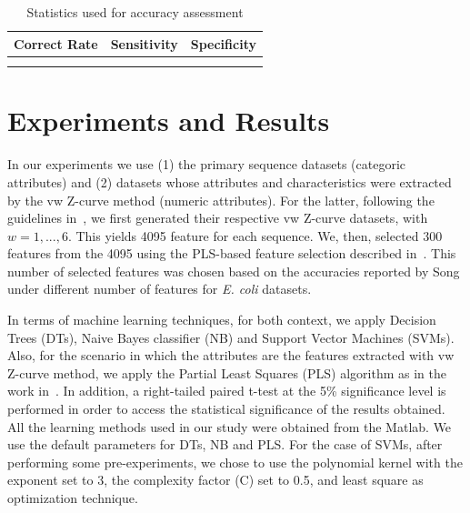 \documentclass[conference]{IEEEtran}
\begin{document}
\begin{table}
\caption{Statistics used for accuracy assessment}
\begin{center}
    \renewcommand{\arraystretch}{1.2}
    \begin{tabular}{>{\centering\arraybackslash} m{} 
                    >{\centering\arraybackslash} m{} 
                    >{\centering\arraybackslash} m{}}
        \hline
            Correct Rate & Sensitivity & Specificity \\
        \hline
            \multirow{2}{*}{$\dfrac {TP+TN}{TP+FP+TN+FN}$}       &
            \multirow{2}{*}{$\dfrac {TP}{TP+FN}$}                &
            \multirow{2}{*}{$\dfrac {TN}{TN+FP}$}                \\
            & & \\
        \hline
    \end{tabular}
\end{center}
\label{table:acc}
\end{table}

\section{Experiments and Results}

In our experiments we use (1) the primary sequence datasets (categoric attributes) and (2) datasets whose attributes and characteristics were extracted by the vw Z-curve method (numeric attributes). For the latter, following the guidelines in~\cite{song2011a}, we first generated their respective vw Z-curve datasets, with $ w = 1, ..., 6 $. This yields 4095 feature for each sequence. We, then, selected 300 features from the 4095 using the PLS-based feature selection described in~\cite{song2011a}. This number of selected features was chosen based on the accuracies reported by Song under different number of features for {\it E. coli } datasets. 

In terms of machine learning techniques, for both context, we apply Decision Trees (DTs), Naive Bayes classifier (NB) and Support Vector Machines (SVMs).  Also, for the scenario in which the attributes are the features extracted with vw Z-curve method, we apply the Partial Least Squares (PLS) algorithm as in the work in~\cite{song2011a}. In addition, a right-tailed paired t-test at the 5\% significance level is performed in order to access the statistical significance of the results obtained. All the learning methods used in our study were obtained from the Matlab. We use the default parameters for DTs, NB and PLS. For the case of SVMs, after performing some pre-experiments, we chose to use the polynomial kernel with the exponent set to 3, the complexity factor (C) set to 0.5, and least square as optimization technique. \\
\end{document}

